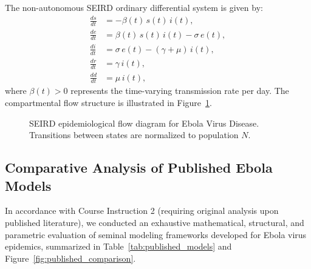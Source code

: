 \documentclass[11pt,a4paper]{article}
\begin{document}
The non-autonomous SEIRD ordinary differential system is given by:
\begin{align}
    \frac{ds}{dt} &= -\beta(t) \, s(t) \, i(t), \label{eq:dsdt} \\
    \frac{de}{dt} &= \beta(t) \, s(t) \, i(t) - \sigma \, e(t), \label{eq:dedt} \\
    \frac{di}{dt} &= \sigma \, e(t) - (\gamma + \mu) \, i(t), \label{eq:didt} \\
    \frac{dr}{dt} &= \gamma \, i(t), \label{eq:drdt} \\
    \frac{dd}{dt} &= \mu \, i(t), \label{eq:dddt}
\end{align}
where $\beta(t) > 0$ represents the time-varying transmission rate per day. The compartmental flow structure is illustrated in Figure~\ref{fig:tikz_seird}.

\begin{figure}[htbp]
\centering
{}
\caption{SEIRD epidemiological flow diagram for Ebola Virus Disease. Transitions between states are normalized to population $N$.}
\label{fig:tikz_seird}
\end{figure}

\subsection{Comparative Analysis of Published Ebola Models}
In accordance with Course Instruction 2 (requiring original analysis upon published literature), we conducted an exhaustive mathematical, structural, and parametric evaluation of seminal modeling frameworks developed for Ebola virus epidemics, summarized in Table~\ref{tab:published_models} and Figure~\ref{fig:published_comparison}.
\end{document}
